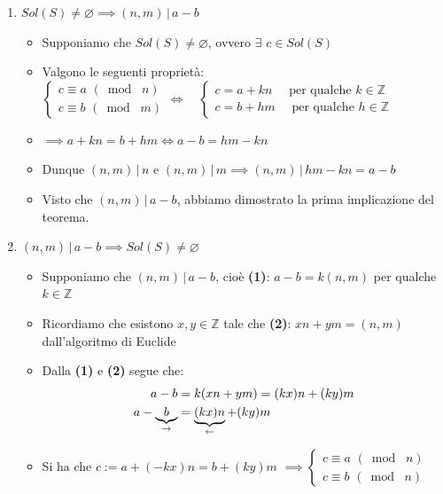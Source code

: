 \documentclass[10pt]{article}
\begin{document}
\begin{enumerate}
\item
$Sol(S) \neq \varnothing \implies (n,m) \,|\, a - b$
\begin{itemize}
\item
Supponiamo che $Sol(S) \neq \varnothing$, ovvero $\exists \,\, c \in Sol(S)$
\item
Valgono le seguenti proprietà:
$\begin{cases} c \equiv a \,\, (\bmod \,\,n) \\ c \equiv b \,\, (\bmod \,\, m)\end{cases} \Longleftrightarrow \quad \begin{cases} c = a+kn \quad \textrm{ per qualche } k \in \mathbb{Z} \\ c = b + hm \quad \! \textrm{ per qualche } h \in \mathbb{Z}  \end{cases}$
\smallskip \smallskip
\item
$\implies a + kn = b + hm \Longleftrightarrow a - b = hm - kn$
\smallskip 
\item
Dunque $(n,m) \,|\, n$ e $(n,m) \,|\, m \implies (n,m) \,|\, hm - kn = a - b$ \smallskip
\item
Visto che $(n,m) \,|\, a - b$, abbiamo dimostrato la prima implicazione del teorema.
\end{itemize}
\item
$(n,m) \,|\, a - b \implies Sol(S) \neq \varnothing$
\begin{itemize}
\item
Supponiamo che $(n,m)\,|\, a - b$, cioè \textbf{(1)}: $a - b = k(n,m)$ per qualche $k \in \mathbb{Z}$ 
\item
Ricordiamo che esistono $x, y \in \mathbb{Z}$ tale che \textbf{(2)}: $xn + ym = (n,m)$ dall'algoritmo di Euclide 
\item
Dalla \textbf{(1)} e \textbf{(2)} segue che:
\begin{equation}
\begin{split}
a - b &= k(xn + ym) = (kx)n + (ky)m \\
a - \underbrace{b}_{\rightarrow} &= \underbrace{(kx)n}_{\leftarrow} + (ky)m
\notag
\end{split}
\end{equation}
\item
Si ha che $c := a + (-kx)n = b + (ky)m$
$\implies \begin{cases} c \equiv a \,\, (\bmod \,\,n) \\ c \equiv b \,\, (\bmod \,\, n)\end{cases}$ \smallskip

\end{itemize}
\end{enumerate}
\end{document}
